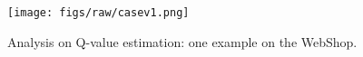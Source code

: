 \begin{figure}[t]
    \centering
    \texttt{[image: figs/raw/casev1.png]}
    \vspace{-15pt}
    \caption{Analysis on Q-value estimation: one example on the WebShop.}
    \vspace{-20pt}
    \label{fig:case}
\end{figure}